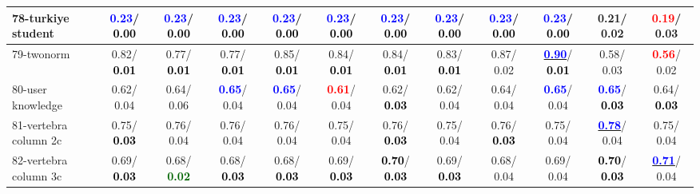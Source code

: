 \begin{table}[h]
\begin{center}
{\begin{tabular}{lc|c|c|c|c|c|c|c|c|c|c}
78-turkiye student & \textcolor{blue}{\textbf{  0.23}}/\textcolor{black}{\textbf{  0.00}} & \textcolor{blue}{\textbf{  0.23}}/\textcolor{black}{\textbf{  0.00}} & \textcolor{blue}{\textbf{  0.23}}/\textcolor{black}{\textbf{  0.00}} & \textcolor{blue}{\textbf{  0.23}}/\textcolor{black}{\textbf{  0.00}} & \textcolor{blue}{\textbf{  0.23}}/\textcolor{black}{\textbf{  0.00}} & \textcolor{blue}{\textbf{  0.23}}/\textcolor{black}{\textbf{  0.00}} & \textcolor{blue}{\textbf{  0.23}}/\textcolor{black}{\textbf{  0.00}} & \textcolor{blue}{\textbf{  0.23}}/\textcolor{black}{\textbf{  0.00}} & \textcolor{blue}{\textbf{  0.23}}/\textcolor{black}{\textbf{  0.00}} &   0.21/  0.02 & \textcolor{red}{\textbf{  0.19}}/  0.03 \\ \hline
79-twonorm &   0.82/\textcolor{black}{\textbf{  0.01}} &   0.77/\textcolor{black}{\textbf{  0.01}} &   0.77/\textcolor{black}{\textbf{  0.01}} &   0.85/\textcolor{black}{\textbf{  0.01}} &   0.84/\textcolor{black}{\textbf{  0.01}} &   0.84/\textcolor{black}{\textbf{  0.01}} &   0.83/\textcolor{black}{\textbf{  0.01}} &   0.87/  0.02 & \underline{\textcolor{blue}{\textbf{  0.90}}}/\textcolor{black}{\textbf{  0.01}} &   0.58/  0.03 & \textcolor{red}{\textbf{  0.56}}/  0.02 \\
80-user knowledge &   0.62/  0.04 &   0.64/  0.06 & \textcolor{blue}{\textbf{  0.65}}/  0.04 & \textcolor{blue}{\textbf{  0.65}}/  0.04 & \textcolor{red}{\textbf{  0.61}}/  0.04 &   0.62/\textcolor{black}{\textbf{  0.03}} &   0.62/  0.04 &   0.64/  0.04 & \textcolor{blue}{\textbf{  0.65}}/  0.04 & \textcolor{blue}{\textbf{  0.65}}/\textcolor{black}{\textbf{  0.03}} &   0.64/\textcolor{black}{\textbf{  0.03}} \\
81-vertebra column 2c &   0.75/\textcolor{black}{\textbf{  0.03}} &   0.76/  0.04 &   0.76/  0.04 &   0.76/  0.04 &   0.75/  0.04 &   0.76/\textcolor{black}{\textbf{  0.03}} &   0.75/  0.04 &   0.76/\textcolor{black}{\textbf{  0.03}} &   0.75/  0.04 & \underline{\textcolor{blue}{\textbf{  0.78}}}/  0.04 &   0.75/  0.04 \\
82-vertebra column 3c &   0.69/\textcolor{black}{\textbf{  0.03}} &   0.68/\textcolor{darkgreen}{\textbf{  0.02}} &   0.68/\textcolor{black}{\textbf{  0.03}} &   0.68/\textcolor{black}{\textbf{  0.03}} &   0.69/\textcolor{black}{\textbf{  0.03}} & \textcolor{black}{\textbf{  0.70}}/\textcolor{black}{\textbf{  0.03}} &   0.69/\textcolor{black}{\textbf{  0.03}} &   0.68/  0.04 &   0.69/  0.04 & \textcolor{black}{\textbf{  0.70}}/\textcolor{black}{\textbf{  0.03}} & \underline{\textcolor{blue}{\textbf{  0.71}}}/  0.04 \\

\end{tabular}}
\end{center}
\end{table}
